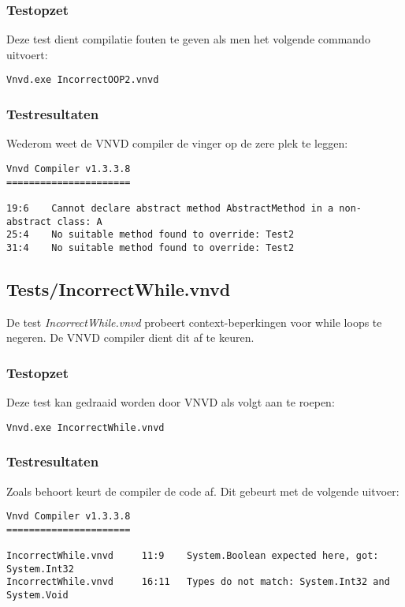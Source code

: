 \subsubsection{Testopzet}
Deze test dient compilatie fouten te geven als men het volgende commando uitvoert:

\begin{lstlisting}
Vnvd.exe IncorrectOOP2.vnvd
\end{lstlisting}

\subsubsection{Testresultaten}
Wederom weet de VNVD compiler de vinger op de zere plek te leggen:

\begin{lstlisting}
Vnvd Compiler v1.3.3.8
======================

19:6    Cannot declare abstract method AbstractMethod in a non-abstract class: A
25:4    No suitable method found to override: Test2
31:4    No suitable method found to override: Test2
\end{lstlisting}

\subsection{Tests/IncorrectWhile.vnvd}
De test \textit{IncorrectWhile.vnvd} probeert context-beperkingen voor while loops te negeren. De VNVD compiler dient dit af te keuren.

\subsubsection{Testopzet}
Deze test kan gedraaid worden door VNVD als volgt aan te roepen:

\begin{lstlisting}
Vnvd.exe IncorrectWhile.vnvd
\end{lstlisting}

\subsubsection{Testresultaten}
Zoals behoort keurt de compiler de code af. Dit gebeurt met de volgende uitvoer:

\begin{lstlisting}
Vnvd Compiler v1.3.3.8
======================

IncorrectWhile.vnvd     11:9    System.Boolean expected here, got: System.Int32
IncorrectWhile.vnvd     16:11   Types do not match: System.Int32 and System.Void
\end{lstlisting}

